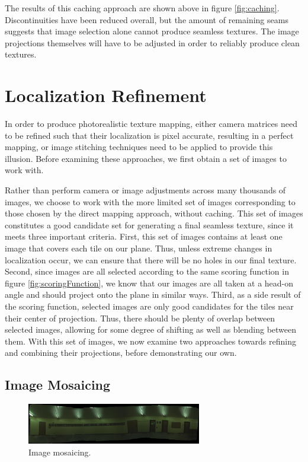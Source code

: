 \documentclass[10pt,twocolumn,letterpaper]{article}
\begin{document}
The results of this caching approach are shown above in figure
\ref{fig:caching}.  Discontinuities have been reduced overall, but the
amount of remaining seams suggests that image selection alone cannot
produce seamless textures. The image projections themselves will have
to be adjusted in order to reliably produce clean textures.


\section{Localization Refinement}
In order to produce photorealistic texture mapping, either camera
matrices need to be refined such that their localization is pixel
accurate, resulting in a perfect mapping, or image stitching
techniques need to be applied to provide this illusion. Before
examining these approaches, we first obtain a set of images to work
with.

Rather than perform camera or image adjustments across many thousands
of images, we choose to work with the more limited set of images
corresponding to those chosen by the direct mapping approach, without
caching. This set of images constitutes a good candidate set for
generating a final seamless texture, since it meets three important
criteria. First, this set of images contains at least one image that
covers each tile on our plane. Thus, unless extreme changes in
localization occur, we can ensure that there will be no holes in our
final texture. Second, since images are all selected according to the
same scoring function in figure \ref{fig:scoringFunction}, we know
that our images are all taken at a head-on angle and should project
onto the plane in similar ways. Third, as a side result of the scoring
function, selected images are only good candidates for the tiles near
their center of projection. Thus, there should be plenty of overlap
between selected images, allowing for some degree of shifting as well
as blending between them. With this set of images, we now examine two
approaches towards refining and combining their projections, before
demonstrating our own.

\subsection{Image Mosaicing}

\begin{figure}
  \centering
  \includegraphics[width=3in]{panoMy.jpg}
  \caption{Image mosaicing. }
  \label{fig:mosaic}
\end{figure}
\end{document}
